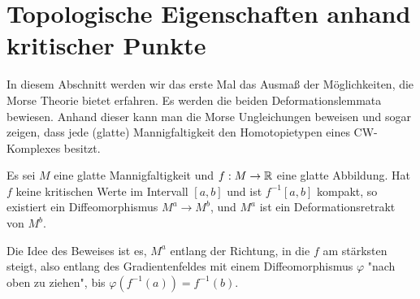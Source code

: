 \section{Topologische Eigenschaften anhand kritischer Punkte}

In diesem Abschnitt werden wir das erste Mal das Ausmaß der Möglichkeiten, die Morse Theorie 
bietet erfahren. Es werden die beiden Deformationslemmata bewiesen. Anhand dieser kann man 
die Morse Ungleichungen beweisen und sogar zeigen, dass jede (glatte) Mannigfaltigkeit
den Homotopietypen eines CW-Komplexes besitzt.

\begin{theorem}
    \label{satz: erstes deformationslemma}
    Es sei $M$ eine glatte Mannigfaltigkeit und $f: M \rightarrow { \mathbb R }$ eine
    glatte Abbildung. Hat $f$ keine kritischen Werte im Intervall $[a, b]$ und 
    ist $f^{-1}[a, b]$ kompakt, so existiert ein Diffeomorphismus 
    $M^a \rightarrow M^b$, und $M^a$ ist ein Deformationsretrakt von $M^b$.
\end{theorem}

Die Idee des Beweises ist es, $M^a$ entlang der Richtung, in die $f$ am stärksten
steigt, also entlang des Gradientenfeldes mit einem Diffeomorphismus $\varphi$ 
"nach oben zu ziehen", bis $\varphi(f^{-1}(a)) = f^{-1}(b)$.

